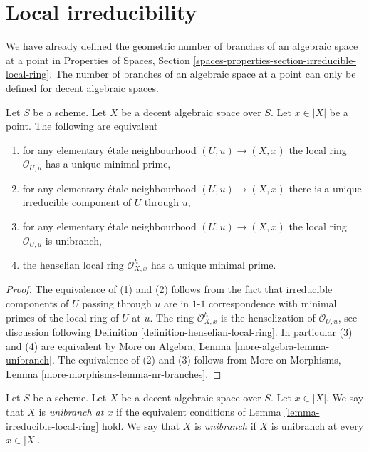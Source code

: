 \section{Local irreducibility}
\label{section-irreducible-local-ring}

\noindent
We have already defined the geometric number of branches of an
algebraic space at a point in Properties of Spaces, Section
\ref{spaces-properties-section-irreducible-local-ring}.
The number of branches of an algebraic space at a point can only
be defined for decent algebraic spaces.

\begin{lemma}
\label{lemma-irreducible-local-ring}
Let $S$ be a scheme. Let $X$ be a decent algebraic space over $S$.
Let $x \in |X|$ be a point. The following are equivalent
\begin{enumerate}
\item for any elementary \'etale neighbourhood $(U, u) \to (X, x)$
the local ring $\mathcal{O}_{U, u}$ has a unique minimal prime,
\item for any elementary \'etale neighbourhood $(U, u) \to (X, x)$
there is a unique irreducible component of $U$ through $u$,
\item for any elementary \'etale neighbourhood $(U, u) \to (X, x)$
the local ring $\mathcal{O}_{U, u}$ is unibranch,
\item the henselian local ring
$\mathcal{O}_{X, x}^h$ has a unique minimal prime.
\end{enumerate}
\end{lemma}

\begin{proof}
The equivalence of (1) and (2) follows from the fact that irreducible
components of $U$ passing through $u$ are in $1$-$1$ correspondence with
minimal primes of the local ring of $U$ at $u$. The ring
$\mathcal{O}_{X, x}^h$ is the henselization of $\mathcal{O}_{U, u}$, see
discussion following Definition \ref{definition-henselian-local-ring}.
In particular (3) and (4) are equivalent by
More on Algebra, Lemma \ref{more-algebra-lemma-unibranch}.
The equivalence of (2) and (3) follows from
More on Morphisms, Lemma \ref{more-morphisms-lemma-nr-branches}.
\end{proof}

\begin{definition}
\label{definition-unibranch}
Let $S$ be a scheme. Let $X$ be a decent algebraic space over $S$.
Let $x \in |X|$. We say that $X$ is {\it unibranch at $x$}
if the equivalent conditions of
Lemma \ref{lemma-irreducible-local-ring} hold.
We say that $X$ is {\it unibranch} if $X$ is
unibranch at every $x \in |X|$.
\end{definition}

